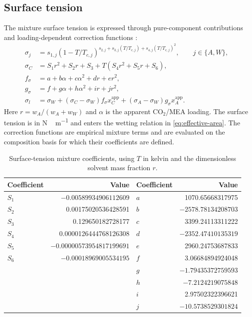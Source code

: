 \subsection{Surface tension}
The mixture surface tension is expressed through pure-component contributions and loading-dependent correction functions \cite{Morgan2015}:
\begin{align}
\sigma_j&=s_{1,j}(1-T/T_{c,j})^{s_{2,j}+s_{3,j}(T/T_{c,j})+s_{4,j}(T/T_{c,j})^2},\qquad j\in\{A,W\},\\
\sigma_C&=S_1r^2+S_2r+S_3+T(S_4r^2+S_5r+S_6),\\
f_\sigma&=a+b\alpha+c\alpha^2+dr+er^2,\\
g_\sigma&=f+g\alpha+h\alpha^2+ir+jr^2,\\
\sigma_l&=\sigma_W+(\sigma_C-\sigma_W)f_\sigma x_C^{\mathrm{app}}
+(\sigma_A-\sigma_W)g_\sigma x_A^{\mathrm{app}}.
\end{align}
Here $r=w_A/(w_A+w_W)$ and $\alpha$ is the apparent CO$_2$/MEA loading.
The surface tension is in \unit{N\,m^{-1}} and enters the wetting relation in \cref{eq:effective-area}.
The correction functions are empirical mixture terms and are evaluated on the composition basis for which their coefficients are defined.

\begin{table}[pos=htbp]
\centering\small
\caption{Surface-tension mixture coefficients, using $T$ in kelvin and the dimensionless solvent mass fraction $r$.}
\label{tab:surface-mixture-coefficients}
\begin{tabular}{@{}lrlr@{}}
\toprule
Coefficient & Value & Coefficient & Value\\
\midrule
$S_1$ & $-0.00589934906112609$ & $a$ & 1070.65668317975\\
$S_2$ & 0.00175020536428591 & $b$ & $-2578.78134208703$\\
$S_3$ & 0.129650182728177 & $c$ & 3399.24113311222\\
$S_4$ & 0.0000126444768126308 & $d$ & $-2352.47410135319$\\
$S_5$ & $-0.00000573954817199691$ & $e$ & 2960.24753687833\\
$S_6$ & $-0.00018969005534195$ & $f$ & 3.06684894924048\\
 & & $g$ & $-1.79435372759593$\\
 & & $h$ & $-7.2124219075848$\\
 & & $i$ & 2.97502322396621\\
 & & $j$ & $-10.5738529301824$\\
\bottomrule
\end{tabular}
\end{table}

